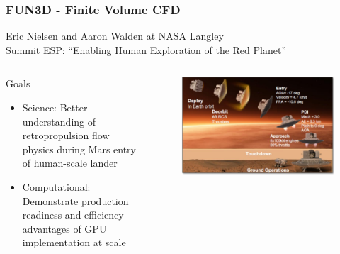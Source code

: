 \documentclass[aspectratio=169]{beamer}
\begin{document}
\begin{frame}
  \frametitle{FUN3D - Finite Volume CFD}
  Eric Nielsen and Aaron Walden at NASA Langley \\
  Summit ESP: ``Enabling Human Exploration of the Red Planet''
  \begin{columns}
    \begin{column}{0.5\textwidth}
      Goals
      \begin{itemize}
        \item Science: Better understanding of retropropulsion flow physics during Mars entry of human-scale lander
        \item Computational: Demonstrate production readiness and efficiency advantages of GPU implementation at scale
      \end{itemize}
    \end{column}
    \begin{column}{0.5\textwidth}
      \begin{figure}
        \centering
        \includegraphics[width=.9\textwidth]{figures/fun3d-EDL.png}
      \end{figure}
    \end{column}
  \end{columns}
\end{frame}
\end{document}
